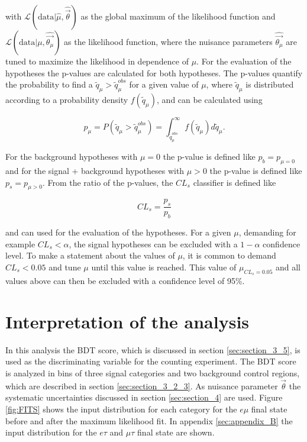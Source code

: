 with $\mathcal{L}(\text{data} | \hat{\mu}, \hat{\vec{\theta}})$ as the global maximum of the likelihood function and $\mathcal{L}(\text{data} | \mu, \hat{\vec{\theta_{\mu}}})$ as the likelihood function, where the nuisance parameters $\hat{\vec{\theta_{\mu}}}$ are tuned to maximize the likelihood in dependence of $\mu$. For the evaluation of the hypotheses the p-values are calculated for both hypotheses. The p-values quantify the probability to find a $\tilde{q}_{\mu} > \tilde{q}_{\mu}^{obs}$ for a given value of $\mu$, where $\tilde{q}_{\mu}$ is distributed according to a probability density $f(\tilde{q}_{\mu})$, and can be calculated using

\begin{equation}
	\label{eq:eq_5_3}
	p_{\mu} = P(\tilde{q}_{\mu} > \tilde{q}_{\mu}^{obs}) = \int_{\tilde{q}_{\mu}^{obs}}^{\infty} f(\tilde{q}_{\mu}) d\tilde{q}_{\mu}.
\end{equation}

For the background hypotheses with $\mu = 0$ the p-value is defined like $p_b = p_{\mu = 0}$ and for the signal + background hypotheses with $\mu>0$ the p-value is defined like $p_s = p_{\mu>0}$. From the ratio of the p-values, the $CL_s$ classifier is defined like

\begin{equation}
	\label{eq:eq_5_4}
	CL_s = \frac{p_s}{p_b}
\end{equation}

and can used for the evaluation of the hypotheses. For a given $\mu$, demanding for example $CL_{s} < \alpha$, the signal hypotheses can be excluded with a $1-\alpha$ confidence level. To make a statement about the values of $\mu$, it is common to demand $CL_{s} < 0.05$ and tune $\mu$ until this value is reached. This value of $\mu_{CL_s = 0.05}$ and all values above can then be excluded with a confidence level of 95\%.

\section{Interpretation of the analysis}
\label{sec:section_5_2}

In this analysis the \gls{BDT} score, which is discussed in section \ref{sec:section_3_5}, is used as the discriminating variable for the counting experiment. The \gls{BDT} score is analyzed in bins of three signal categories and two background control regions, which are described in section \ref{sec:section_3_2_3}. As nuisance parameter $\vec{\theta}$ the systematic uncertainties discussed in section \ref{sec:section_4} are used. Figure \ref{fig:FITS} shows the input distribution for each category for the $e\mu$ final state before and after the maximum likelihood fit. In appendix \ref{sec:appendix_B} the input distribution for the $e\tau$ and $\mu\tau$ final state are shown. \\

